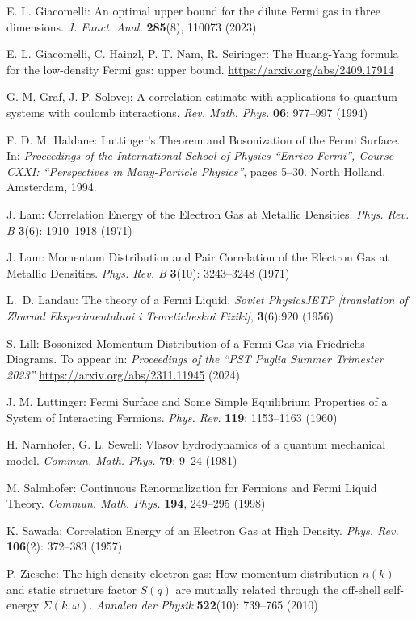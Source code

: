 \documentclass[12pt,a4paper]{article}
\numberwithin{equation}{section}
\newcommand{\1}{\mathbb{I}}
\theoremstyle{plain}
\theoremstyle{definition}
\theoremstyle{remark}
\theoremstyle{plain}
\theoremstyle{definition}
\theoremstyle{remark}
\begin{document}
\begin{thebibliography}{29}
E. L. Giacomelli:
	An optimal upper bound for the dilute Fermi gas in three dimensions.
	\emph{J. Funct. Anal.} \textbf{285}(8), 110073 (2023)

E. L. Giacomelli, C. Hainzl, P. T. Nam, R. Seiringer:
	The Huang-Yang formula for the low-density Fermi gas: upper bound.
	\url{https://arxiv.org/abs/2409.17914}

G. M. Graf, J. P. Solovej:
	A correlation estimate with applications to quantum systems with coulomb interactions.
	\emph{Rev. Math. Phys.} \textbf{06}: 977--997 (1994)

F. D. M. Haldane:
	Luttinger's {{Theorem}} and {{Bosonization}} of the {{Fermi Surface}}.
	In: \emph{Proceedings of the {{International School}} of {{Physics}}
  ``{{Enrico Fermi}}'', {{Course CXXI}}: ``{{Perspectives}} in
  {{Many}}-{{Particle Physics}}''}, pages 5--30. {North Holland}, {Amsterdam},
  1994.

J. Lam:
	Correlation Energy of the Electron Gas at Metallic Densities.
	\emph{Phys. Rev. B} \textbf{3}(6): 1910--1918 (1971)

J. Lam:
	Momentum Distribution and Pair Correlation of the Electron Gas at Metallic Densities.
	\emph{Phys. Rev. B} \textbf{3}(10): 3243--3248 (1971)

L.~D. Landau:
	The theory of a Fermi Liquid.
	\emph{Soviet Physics\textendash JETP [translation of Zhurnal
  Eksperimentalnoi i Teoreticheskoi Fiziki]}, \textbf{3}(6):920 (1956)

S. Lill:
	Bosonized Momentum Distribution of a Fermi Gas via Friedrichs Diagrams.
	To appear in: \emph{Proceedings of the ``PST Puglia Summer Trimester 2023''} \url{https://arxiv.org/abs/2311.11945} (2024)

J. M. Luttinger:
	Fermi Surface and Some Simple Equilibrium Properties of a System of Interacting Fermions.
	\emph{Phys. Rev.} {\bf 119}: 1153--1163 (1960)

H. Narnhofer, G. L. Sewell:
	Vlasov hydrodynamics of a quantum mechanical model.
	\emph{Commun. Math. Phys.} {\bf 79}: 9--24 (1981)

M. Salmhofer:
	Continuous Renormalization for Fermions and Fermi Liquid Theory.
	\emph{Commun. Math. Phys.} \textbf{194}, 249--295 (1998)

K. Sawada:
	Correlation Energy of an Electron Gas at High Density.
	\emph{Phys. Rev.} \textbf{106}(2): 372--383 (1957)

P. Ziesche:
	The high-density electron gas: How momentum distribution $n(k)$ and static structure factor $S(q)$ are mutually related through the off-shell self-energy $\Sigma(k,\omega)$.
	\emph{Annalen der Physik} \textbf{522}(10): 739--765 (2010)

\end{thebibliography}
\end{document}
